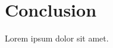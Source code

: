 \documentclass[11pt]{article}
\begin{document}
\section{Conclusion}
Lorem ipsum dolor sit amet.
\end{document}
